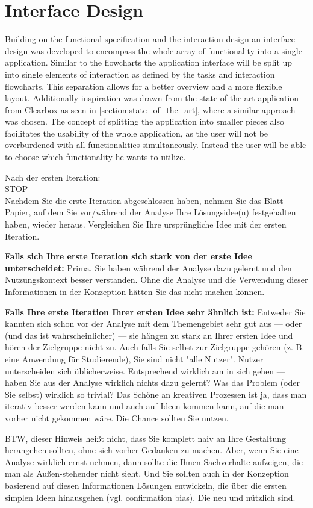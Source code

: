 \documentclass[11pt,a4paper,english]{scrreprt}
\newenvironment{comment}
  {\par\medskip
   \begingroup\color{olive}%
   }
 {\endgroup
  \medskip}
\begin{document}
\section{Interface Design}\label{section:interface_design}
Building on the functional specification and the interaction design an interface design was developed to encompass the whole array of functionality into a single application. Similar to the flowcharts the application interface will be split up into single elements of interaction as defined by the tasks and interaction flowcharts. This separation allows for a better overview and a more flexible layout. Additionally inspiration was drawn from the state-of-the-art application from Clearbox as seen in \autoref{section:state_of_the_art}, where a similar approach was chosen. The concept of splitting the application into smaller pieces also facilitates the usability of the whole application, as the user will not be overburdened with all functionalities simultaneously. Instead the user will be able to choose which functionality he wants to utilize.

\newpage
\begin{comment}
\begin{center}
\huge
Nach der ersten Iteration:\\STOP\\
\normalsize
Nachdem Sie die erste Iteration abgeschlossen haben, nehmen Sie das Blatt Papier, auf dem Sie vor/während der Analyse Ihre Lösungsidee(n) festgehalten haben, wieder heraus. Vergleichen Sie Ihre ursprüngliche Idee mit der ersten Iteration.

\textbf{Falls sich Ihre erste Iteration sich stark von der erste Idee unterscheidet:} Prima. Sie haben während der Analyse dazu gelernt und den Nutzungskontext besser verstanden. Ohne die Analyse und die Verwendung dieser Informationen in der Konzeption hätten Sie das nicht machen können.

\textbf{Falls Ihre erste Iteration Ihrer ersten Idee sehr ähnlich ist:} Entweder Sie kannten sich schon vor der Analyse mit dem Themengebiet sehr gut aus — oder (und das ist wahrscheinlicher) — sie hängen zu stark an Ihrer ersten Idee und hören der Zielgruppe nicht zu. Auch falls Sie selbst zur Zielgruppe gehören (z. B. eine Anwendung für Studierende), Sie sind nicht "alle Nutzer". Nutzer unterscheiden sich üblicherweise. Entsprechend wirklich am in sich gehen — haben Sie aus der Analyse wirklich nichts dazu gelernt? Was das Problem (oder Sie selbst) wirklich so trivial? Das Schöne an kreativen Prozessen ist ja, dass man iterativ besser werden kann und auch auf Ideen kommen kann, auf die man vorher nicht gekommen wäre. Die Chance sollten Sie nutzen.

BTW, dieser Hinweis heißt nicht, dass Sie komplett naiv an Ihre Gestaltung herangehen sollten, ohne sich vorher Gedanken zu machen. Aber, wenn Sie eine Analyse wirklich ernst nehmen, dann sollte die Ihnen Sachverhalte aufzeigen, die man als Außen-stehender nicht sieht. Und Sie sollten auch in der Konzeption basierend auf diesen Informationen Lösungen entwickeln, die über die ersten simplen Ideen hinausgehen (vgl. confirmation bias). Die neu und nützlich sind.
\end{center}
\end{comment}
\end{document}

